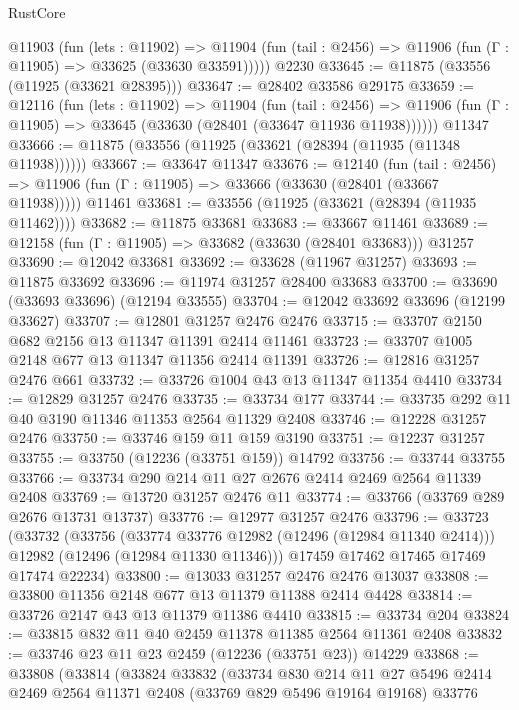 \begin{lexlean}{RustCore}
\begin{coremodule}
    @11903
      (fun (lets : @11902) =>
      @11904 (fun (tail : @2456) => @11906 (fun (Γ : @11905) => @33625 (@33630 @33591)))))
    @2230
@33645 := @11875 (@33556 (@11925 (@33621 @28395)))
@33647 := @28402 @33586 @29175
@33659 := @12116
    (fun (lets : @11902) =>
    @11904
      (fun (tail : @2456) =>
      @11906 (fun (Γ : @11905) => @33645 (@33630 (@28401 (@33647 @11936 @11938))))))
    @11347
@33666 := @11875 (@33556 (@11925 (@33621 (@28394 (@11935 (@11348 @11938))))))
@33667 := @33647 @11347
@33676 := @12140
    (fun (tail : @2456) => @11906 (fun (Γ : @11905) => @33666 (@33630 (@28401 (@33667 @11938)))))
    @11461
@33681 := @33556 (@11925 (@33621 (@28394 (@11935 @11462))))
@33682 := @11875 @33681
@33683 := @33667 @11461
@33689 := @12158 (fun (Γ : @11905) => @33682 (@33630 (@28401 @33683))) @31257
@33690 := @12042 @33681
@33692 := @33628 (@11967 @31257)
@33693 := @11875 @33692
@33696 := @11974 @31257 @28400 @33683
@33700 := @33690 (@33693 @33696) (@12194 @33555)
@33704 := @12042 @33692 @33696 (@12199 @33627)
@33707 := @12801 @31257 @2476 @2476
@33715 := @33707 @2150 @682 @2156 @13 @11347 @11391 @2414 @11461
@33723 := @33707 @1005 @2148 @677 @13 @11347 @11356 @2414 @11391
@33726 := @12816 @31257 @2476 @661
@33732 := @33726 @1004 @43 @13 @11347 @11354 @4410
@33734 := @12829 @31257 @2476
@33735 := @33734 @177
@33744 := @33735 @292 @11 @40 @3190 @11346 @11353 @2564 @11329 @2408
@33746 := @12228 @31257 @2476
@33750 := @33746 @159 @11 @159 @3190
@33751 := @12237 @31257
@33755 := @33750 (@12236 (@33751 @159)) @14792
@33756 := @33744 @33755
@33766 := @33734 @290 @214 @11 @27 @2676 @2414 @2469 @2564 @11339 @2408
@33769 := @13720 @31257 @2476 @11
@33774 := @33766 (@33769 @289 @2676 @13731 @13737)
@33776 := @12977 @31257 @2476
@33796 := @33723
    (@33732
      (@33756
        (@33774 @33776 @12982 (@12496 (@12984 @11340 @2414)))
        @12982
        (@12496 (@12984 @11330 @11346)))
      @17459
      @17462
      @17465
      @17469
      @17474
      @22234)
@33800 := @13033 @31257 @2476 @2476 @13037
@33808 := @33800 @11356 @2148 @677 @13 @11379 @11388 @2414 @4428
@33814 := @33726 @2147 @43 @13 @11379 @11386 @4410
@33815 := @33734 @204
@33824 := @33815 @832 @11 @40 @2459 @11378 @11385 @2564 @11361 @2408
@33832 := @33746 @23 @11 @23 @2459 (@12236 (@33751 @23)) @14229
@33868 := @33808
    (@33814
      (@33824
        @33832
        (@33734
          @830
          @214
          @11
          @27
          @5496
          @2414
          @2469
          @2564
          @11371
          @2408
          (@33769 @829 @5496 @19164 @19168)
          @33776

\end{coremodule}
\end{lexlean}
